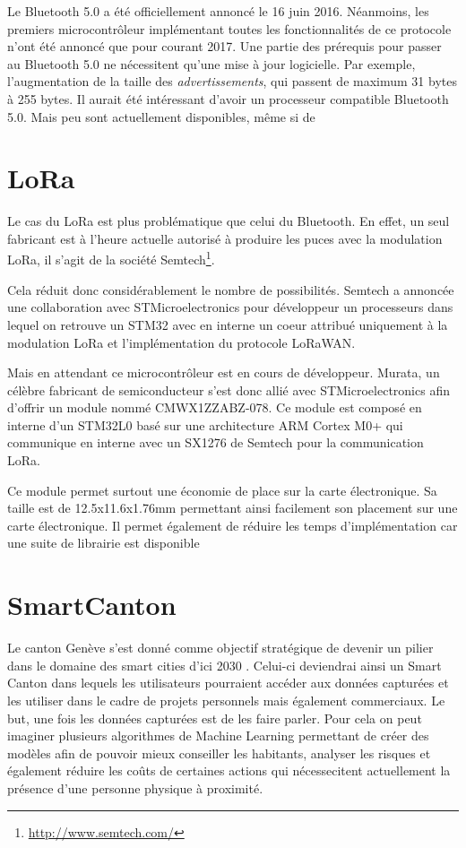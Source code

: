 Le Bluetooth 5.0 a été officiellement annoncé le 16 juin 2016. Néanmoins, les premiers microcontrôleur implémentant toutes les fonctionnalités de ce protocole n'ont été annoncé que pour courant 2017. Une partie des prérequis pour passer au Bluetooth 5.0 ne nécessitent qu'une mise à jour logicielle. Par exemple, l'augmentation de la taille des \textit{advertissements}, qui passent de maximum 31 bytes à 255 bytes. Il aurait été intéressant d'avoir un processeur compatible Bluetooth 5.0. Mais peu sont actuellement disponibles, même si de 



\section{LoRa}

Le cas du LoRa est plus problématique que celui du Bluetooth. En effet, un seul fabricant est à l'heure actuelle autorisé à produire les puces avec la modulation LoRa, il s'agit de la société Semtech\footnote{\url{http://www.semtech.com/}}. 

Cela réduit donc considérablement le nombre de possibilités. Semtech a annoncée une collaboration avec STMicroelectronics pour développeur un processeurs dans lequel on retrouve un STM32 avec en interne un coeur attribué uniquement à la modulation LoRa et l'implémentation du protocole LoRaWAN.


Mais en attendant ce microcontrôleur est en cours de développeur. Murata, un célèbre fabricant de semiconducteur s'est donc allié avec STMicroelectronics afin d'offrir un module nommé CMWX1ZZABZ-078. Ce module est composé en interne d'un STM32L0 basé sur une architecture ARM Cortex M0+ qui communique en interne avec un SX1276 de Semtech pour la communication LoRa.

Ce module permet surtout une économie de place sur la carte électronique. Sa taille est de 12.5x11.6x1.76mm permettant ainsi facilement son placement sur une carte électronique. Il permet également de réduire les temps d'implémentation car une suite de librairie est disponible 




\section{SmartCanton}



Le canton Genève s'est donné comme objectif stratégique de devenir un pilier dans le domaine des smart cities d'ici 2030 \cite{Genevebr38:online}. Celui-ci deviendrai ainsi un Smart Canton dans lequels les utilisateurs pourraient accéder aux données capturées et les utiliser dans le cadre de projets personnels mais également commerciaux. Le but, une fois les données capturées est de les faire parler. Pour cela on peut imaginer plusieurs algorithmes de Machine Learning permettant de créer des modèles afin de pouvoir mieux conseiller les habitants, analyser les risques et également réduire les coûts de certaines actions qui nécessecitent actuellement la présence d'une personne physique à proximité. 

